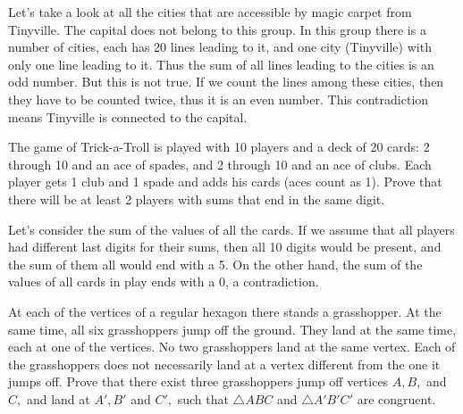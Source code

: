 \documentclass{article}
\begin{document}
\begin{soln}
    Let's take a look at all the cities that are accessible by magic carpet from Tinyville.
    The capital does not belong to this group. In this group there is a number of cities, each has 20 lines leading to it,
    and one city (Tinyville) with only one line leading to it. Thus the sum of all lines leading to the cities is an odd number.
    But this is not true. If we count the lines among these cities, then they have to be counted twice, thus it is an even number.
    This contradiction means Tinyville is connected to the capital.
\end{soln}

\newpage

\begin{example*}[Example 9]
    The game of Trick-a-Troll is played with 10 players and a deck of 20 cards:
    2 through 10 and an ace of spades, and 2 through 10 and an ace of clubs.
    Each player gets 1 club and 1 spade and adds his cards (aces count as 1).
    Prove that there will be at least 2 players with sums that end in the same digit.
\end{example*}

\begin{soln}
    Let's consider the sum of the values of all the cards.
    If we assume that all players had different last digits for their sums, then all 10 digits would be present, and the sum of them all would end with a 5.
    On the other hand, the sum of the values of all cards in play ends with a 0, a contradiction.
\end{soln}

\begin{example*}[Example 10]
    At each of the vertices of a regular hexagon there stands a grasshopper.
    At the same time, all six grasshoppers jump off the ground. They land at the same time,
    each at one of the vertices. No two grasshoppers land at the same vertex.
    Each of the grasshoppers does not necessarily land at a vertex different from the one it jumps off.
    Prove that there exist three grasshoppers jump off vertices $A, B,$ and $C,$
    and land at $A', B'$ and $C',$ such that $\triangle ABC$ and $\triangle A'B'C'$ are congruent.
\end{example*}
\end{document}
